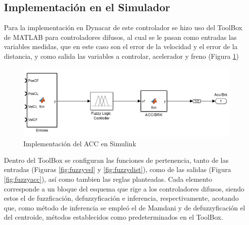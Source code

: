 \subsection{Implementación en el Simulador}

Para la implementación en Dynacar de este controlador se hizo uso del ToolBox de MATLAB para controladores difusos, al cual se le pasan como entradas las variables medidas, que en este caso son el error de la velocidad y el error de la distancia, y como salida las variables a controlar, acelerador y freno (Figura \ref{fig:accdyna})\\ 

\begin{figure}[!h]
	\centering
		\includegraphics[scale=0.3]{Imagenes/accdyna}
		\caption{Implementación del ACC en Simulink}
		\label{fig:accdyna}
\end{figure}	 

\par Dentro del ToolBox se configuran las funciones de pertenencia, tanto de las entradas (Figuras \ref{fig:fuzzyvel} y \ref{fig:fuzzydist}), como de las salidas (Figura \ref{fig:fuzzyacc}), así como tambien las reglas planteadas. Cada elemento corresponde a un bloque del esquema que rige a los controladores difusos, siendo estos el de fuzzficación, defuzzyficación e inferencia, respectivamente, acotando que, como método de inferencia se empleó el de Mamdani y de defuzzyficación el del centroide, métodos establecidos como predeterminados en el ToolBox. 

